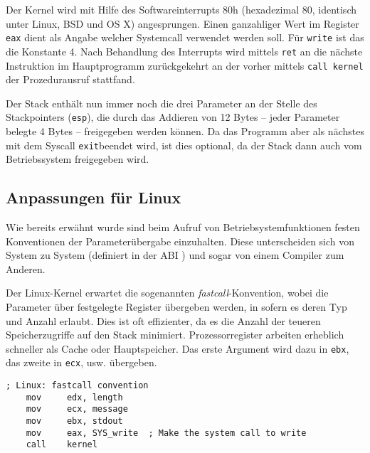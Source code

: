 Der Kernel wird mit Hilfe des Softwareinterrupts 80h (hexadezimal 80, identisch unter Linux, BSD und OS X) angesprungen. Einen ganzahliger Wert im Register \texttt{eax} dient als Angabe welcher Systemcall verwendet werden soll. Für {\tt write} ist das die Konstante 4. Nach Behandlung des Interrupts wird mittels \texttt{ret} an die nächste Instruktion im Hauptprogramm zurückgekehrt an der vorher mittels \texttt{call kernel} der Prozedurausruf stattfand.

Der Stack enthält nun immer noch die drei Parameter an der Stelle des Stackpointers ({\tt esp}), die durch das Addieren von 12 Bytes – jeder Parameter belegte 4 Bytes – freigegeben werden können. Da das Programm aber als nächstes mit dem Syscall \texttt{exit}beendet wird, ist dies optional, da der Stack dann auch vom Betriebssystem freigegeben wird.


\subsection{Anpassungen für Linux}

Wie bereits erwähnt wurde sind beim Aufruf von Betriebsystemfunktionen festen Konventionen \cite{wp:callconv} der Parameterübergabe einzuhalten. Diese unterscheiden sich von System zu System (definiert in der ABI \cite{wp:abi}) und sogar von einem Compiler zum Anderen.

Der Linux-Kernel erwartet die sogenannten \emph{fastcall}-Konvention, wobei die Parameter über festgelegte Register übergeben werden, in sofern es deren Typ und Anzahl erlaubt. Dies ist oft effizienter, da es die Anzahl der teueren Speicherzugriffe auf den Stack minimiert. Prozessorregister arbeiten erheblich schneller als Cache oder Hauptspeicher. Das erste Argument wird dazu in {\tt ebx}, das zweite in {\tt ecx}, usw. übergeben.

\begin{lstlisting}[caption=Linux-Kernel Aufrufkonvention]
    ; Linux: fastcall convention
    mov     edx, length
    mov     ecx, message
    mov     ebx, stdout
    mov     eax, SYS_write  ; Make the system call to write
    call    kernel
\end{lstlisting}

